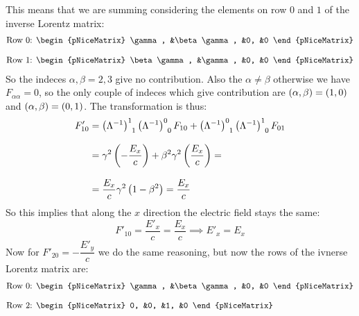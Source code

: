 This means that we are summing considering the elements on row $0$ and $1$ of the inverse Lorentz matrix:
\begin{equation}
  \begin{split}
    &\text{Row 0: } \begin{pNiceMatrix}
      \gamma, &\beta\gamma, &0, &0
    \end{pNiceMatrix} \\[8pt]
    &\text{Row 1: } \begin{pNiceMatrix}
      \beta\gamma, &\gamma, &0, &0
    \end{pNiceMatrix}
  \end{split}
\end{equation}
So the indeces $\alpha,\beta=2,3$ give no contribution. Also the $\alpha \neq \beta$ otherwise we have $F_{\alpha\alpha} = 0$, so the only couple of indeces which give contribution are $\left(\alpha, \beta\right) = \left(1, 0\right)$ and $\left(\alpha, \beta\right) = \left(0, 1\right)$. The transformation is thus:
\begin{equation}
  \begin{split}
    F'_{10} &= \tensor{\brackets{\lm^{-1}}}{^{1}_{1}}\tensor{\brackets{\lm^{-1}}}{^{0}_{0}}F_{10} + \tensor{\brackets{\lm^{-1}}}{^{0}_{1}}\tensor{\brackets{\lm^{-1}}}{^{1}_{0}}F_{01} \\[8pt]
    &= \gamma^2\brackets{-\dfrac{E_x}{c}} + \beta^2\gamma^2\brackets{\dfrac{E_x}{c}} = \\[8pt]
    &= \dfrac{E_x}{c}\gamma^2\brackets{1-\beta^2} = \dfrac{E_x}{c}
  \end{split}
\end{equation}
So this implies that along the $x$ direction the electric field stays the same:
\begin{equation}
  F'_{10} = \dfrac{E'_x}{c} = \dfrac{E_x}{c} \implies E'_x = E_x
\end{equation}
Now for $F'_{20} = -\dfrac{E'_y}{c}$ we do the same reasoning, but now the rows of the ivnerse Lorentz matrix are:
\begin{equation}
  \begin{split}
    &\text{Row 0: } \begin{pNiceMatrix}
      \gamma, &\beta\gamma, &0, &0
    \end{pNiceMatrix}\\[8pt]
    &\text{Row 2: } \begin{pNiceMatrix}
      0, &0, &1, &0
    \end{pNiceMatrix}
  \end{split}
\end{equation}
